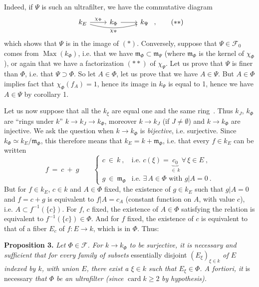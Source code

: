 \documentclass[11pt]{article}
\newcommand{\printedpage}[1]{\marginpar{\footnotesize p.~#1}}
\newcommand{\msp}[1]{\marginpar{\footnotesize [#1]}}
\begin{document}
Indeed, if $\Psi$ is such an ultrafilter, we
\msp{page 8}
have the commutative diagram
\[
\begin{tikzcd}
k_E \arrow[r, "\chi_\Phi"] \arrow[rr, bend right=15, "\chi_\Psi"'] & k_\Phi \arrow[r] & k_\Psi
\end{tikzcd}\ , \tag*{$(**)$}
\]
which shows that $\Psi$ is in the image of $(*)$. Conversely, suppose that $\Psi\in\mathcal{F}_0$ comes from $\operatorname{Max}(k_\Phi)$, i.e. that we have $\mathfrak{m}_\Phi\subset\mathfrak{m}_\Psi$ (where $\mathfrak{m}_\Phi$ is the kernel of $\chi_\Phi$), or again that we have a factorization $(**)$ of $\chi_\Psi$. Let us prove that $\Psi$ is finer than $\Phi$, i.e. that $\Psi\supset\Phi$. So let $A\in\Phi$, let us prove that we have $A\in\Psi$. But $A\in\Phi$ implies fact that $\chi_\Phi(f_A)=1$, hence its image in $k_\Psi$ is equal to 1, hence we have $A\in\Psi$ by corollary 1.

\printedpage{195}

\msp{page 9}
Let us now suppose that all the $k_\xi$ are equal one and the same ring \,. Thus $k_J$, $k_\Phi$ are ``rings under $k$'' $k\longrightarrow k_J\longrightarrow k_\Phi$, moreover $k\longrightarrow k_J$ (if $J\neq\emptyset$) and $k\longrightarrow k_\Phi$ are injective. We ask the question when $k\longrightarrow k_\Phi$ is \textit{bijective}, i.e. surjective. Since $k_\Phi\simeq k_E/\mathfrak{m}_\Phi$, this therefore means that $k_E=k+\mathfrak{m}_\Phi$, i.e. that every $f\in k_E$ can be written
\[
f\ =\ c\ +\ g\qquad
\begin{cases}
c\ \in\ k\ , & \text{i.e. } c(\xi)=\underbrace{c_0}_{\in\,k}\ \forall\,\xi\in E\ ,\\[2ex]
g\ \in\ \mathfrak{m}_\Phi & \text{i.e. } \exists\,A\in\Phi \text{ with } g|A=0\ .
\end{cases}
\]
But for $f\in k_E$, $c\in k$ and $A\in\Phi$ fixed, the existence of $g\in k_E$ such that $g|A=0$ and $f=c+g$ is equivalent to $f|A=c_A$ (constant function on $A$, with value $c$), i.e. $A\subset f^{-1}(\{c\})$. For $f$, $c$ fixed, the existence of $A\in\Phi$ satisfying the relation is equivalent to $f^{-1}(\{c\})\in\Phi$. And for $f$ fixed, the existence of $c$ is equivalent to that of a fiber $E_c$ of $f:E\longrightarrow k$, which is in $\Phi$. Thus:

\textbf{Proposition 3.} \textit{Let $\Phi\in\mathcal{F}$. For $k\longrightarrow k_\Phi$ to be surjective, it is necessary and sufficient that for every family of subsets} essentially disjoint \textit{$(E_\xi)_{\xi\in k}$ of $E$ indexed by $k$, with union $E$, there exist a $\xi\in k$ such that $E_\xi\in\Phi$. A fortiori, it} is necessary \textit{that $\Phi$ be an ultrafilter (since} $\operatorname{card}k\geqslant 2$ \textit{by hypothesis).}
\end{document}

